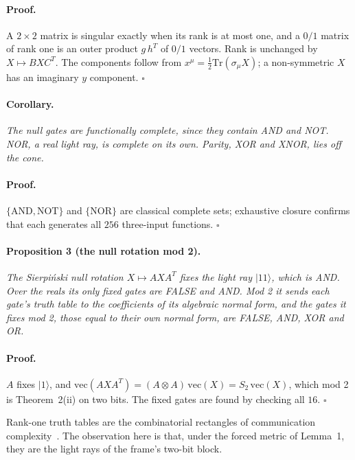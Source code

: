 \documentclass[twocolumn]{iopjournal}
\begin{document}
\paragraph{Proof.} A $2\times2$ matrix is singular exactly when its
rank is at most one, and a $0/1$ matrix of rank one is an outer product
$g\,h^T$ of $0/1$ vectors. Rank is unchanged by $X \mapsto BXC^T$. The
components follow from $x^\mu = \tfrac12\mathrm{Tr}(\sigma_\mu X)$; a
non-symmetric $X$ has an imaginary $y$ component.
\hfill $\square$

\paragraph{Corollary.} \textit{The null gates are functionally
complete, since they contain AND and NOT. NOR, a real light ray, is
complete on its own. Parity, XOR and XNOR, lies off the cone.}

\paragraph{Proof.} $\{\mathrm{AND}, \mathrm{NOT}\}$ and
$\{\mathrm{NOR}\}$ are classical complete sets; exhaustive closure
confirms that each generates all $256$ three-input functions.
\hfill $\square$

\paragraph{Proposition 3 (the null rotation mod 2).} \textit{The
Sierpi\'nski null rotation $X \mapsto AXA^T$ fixes the light ray
$|11\rangle$, which is AND. Over the reals its only fixed gates are
FALSE and AND. Mod 2 it sends each gate's truth table to the
coefficients of its algebraic normal form, and the gates it fixes mod 2,
those equal to their own normal form, are FALSE, AND, XOR and OR.}

\paragraph{Proof.} $A$ fixes $|1\rangle$, and $\mathrm{vec}(AXA^T) = (A\otimes A)
\,\mathrm{vec}(X) = S_2\,\mathrm{vec}(X)$, which mod 2 is
Theorem~2(ii) on two bits. The fixed gates are found by checking all $16$. \hfill $\square$

\medskip
\noindent
Rank-one truth tables are the combinatorial rectangles of
communication complexity~\cite{Kushilevitz1997}. The observation here
is that, under the forced metric of Lemma~1, they are the light rays of
the frame's two-bit block.
\end{document}
